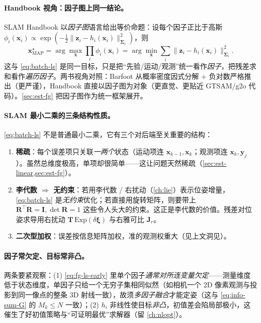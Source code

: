 \paragraph{Handbook 视角：因子图上同一结论。}
SLAM Handbook\cite{carlone2026handbook} 以\emph{因子图}语言给出等价命题：设每个因子正比于高斯 $\phi_i(\mathbf{x}_i)\propto\exp(-\tfrac12\|\mathbf{z}_i-h_i(\mathbf{x}_i)\|_{\boldsymbol{\Sigma}_i}^2)$，则
\begin{equation}
  \mathbf{x}^\star_{\mathrm{MAP}}=\arg\max_{\mathbf{x}}\prod_i\phi_i(\mathbf{x}_i)=\arg\min_{\mathbf{x}}\sum_i\|\mathbf{z}_i-h_i(\mathbf{x}_i)\|_{\boldsymbol{\Sigma}_i}^2.
  \label{eq:fg-ls-early}
\end{equation}
这与 \cref{eq:batch-ls} 是同一目标，只是把“先验/运动/观测”统一看作\emph{因子}，把残差求和看作\emph{遍历因子}。两书视角对照：Barfoot 从概率密度因式分解 $+$ 负对数严格推出（更严谨），Handbook 直接以因子图为对象（更直觉、更贴近 GTSAM/g2o 代码）。\cref{sec:est-fg} 把因子图作为统一框架展开。

\paragraph{SLAM 最小二乘的三条结构性质。}
\cref{eq:batch-ls} 不是普通最小二乘，它有三个对后端至关重要的结构\cite{gaoxiang2019slam14,carlone2026handbook}：
\begin{enumerate}
  \item \textbf{稀疏}：每个误差项只关联\emph{一两个}状态（运动项连 $\mathbf{x}_{k-1},\mathbf{x}_k$；观测项连 $\mathbf{x}_k,\mathbf{y}_j$）。虽然总维度极高，单项却很简单——这让问题天然稀疏（\cref{sec:est-linear,sec:est-fg}）。
  \item \textbf{李代数 $\Rightarrow$ 无约束}：若用李代数 / 右扰动（\cref{ch:lie}）表示位姿增量，\cref{eq:batch-ls} 是\emph{无约束}优化；若直接用旋转矩阵，则要带上 $\mathbf{R}^\top\mathbf{R}=\mathbf{I},\det\mathbf{R}=1$ 这些令人头大的约束。这正是李代数的价值。残差对位姿求导用右扰动 $\mathbf{T}\,\mathrm{Exp}(\delta\boldsymbol{\xi})$ 与右雅可比 $\mathbf{J}_r$。
  \item \textbf{二次型加权}：误差按信息矩阵加权，准的观测权重大（见上文洞见）。
\end{enumerate}

\paragraph{因子常欠定、目标常非凸。}
两条要紧观察\cite{carlone2026handbook}：(1) \cref{eq:fg-ls-early} 里单个因子\emph{通常对所连变量欠定}——测量维度低于状态维度，单因子只给一个无穷子集相同似然（如相机一个 2D 像素观测与投影到同一像点的整条 3D 射线一致），故须\emph{多因子融合}才能定姿（这与 \cref{eq:info-sum-G} 的 $M_k\le N$ 一致）；(2) $h_i$ 非线性使目标\emph{非凸}，初值差会陷局部极小，这催生了好初值策略与“可证明最优”求解器（留 \cref{ch:nlopt}）。

